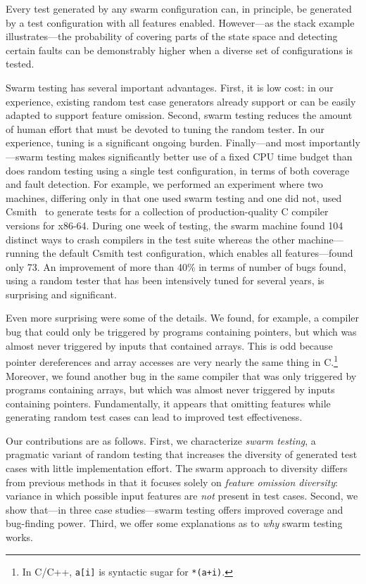 Every test generated by any swarm configuration can, in principle, be
generated by a test configuration with all features enabled.
%
However---as the stack example illustrates---the probability of
covering parts of the state space and detecting certain faults can be
demonstrably higher when a diverse set of configurations is tested.


Swarm testing has several important advantages.
%
First, it is low cost: in our experience, existing random test case
generators already support or can be easily adapted to support feature omission.
%
Second, swarm testing reduces the amount of human effort that must be devoted
to tuning the random tester.
%
In our experience, tuning is a significant ongoing burden.
%
Finally---and most importantly---swarm testing makes significantly
better use of a fixed CPU time budget than does random testing using a
single test configuration, in terms of both coverage and fault
detection.
%
For example, we performed an experiment where two machines, differing
only in that one used swarm testing and one did not, used
Csmith~\cite{csmith} to generate tests for a collection
of production-quality C compiler versions for x86-64.
% 
During one week of testing, the swarm machine found 104 distinct ways
to crash compilers in the test suite whereas the other
machine---running the default Csmith test configuration, which enables all
features---found only 73.
%
An improvement of more than 40\% in terms of number of bugs found,
using a random tester that has been intensively tuned for several
years, is surprising and significant.


Even more surprising were some of the details.
%
We found, for example, a compiler bug that could only be triggered by
programs containing pointers, but which was almost never triggered by
inputs that contained arrays.
%
This is odd because pointer dereferences and array accesses are very
nearly the same thing in C\@.\footnote{In C/C++, \texttt{a[i]} is
  syntactic sugar for \texttt{*(a+i)}.}
% 
Moreover, we found another bug in the same compiler that was only
triggered by programs containing arrays, but which was almost never
triggered by inputs containing pointers.
%
Fundamentally, it appears that omitting features while
generating random test cases can lead to improved test effectiveness.


Our contributions are as follows.
%
First, we characterize \emph{swarm testing}, a pragmatic variant of
random testing that increases the diversity of generated test
cases with little implementation effort.
%
The swarm approach to diversity differs from previous methods
in that it focuses solely on \emph{feature omission diversity}:
variance in which possible input features are \emph{not} present in
test cases.
%
Second, we show that---in three case studies---swarm testing offers
improved coverage and bug-finding power.
%
Third, we offer some explanations as to \emph{why} swarm testing works.
